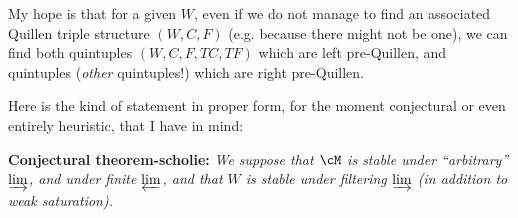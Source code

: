 My hope is that for a given $W$, even if we do not manage to find an associated Quillen triple structure $(W,C,F)$ (e.g. because there might not be one), we can find both quintuples $(W,C,F,TC,TF)$ which are left pre-Quillen, and quintuples (\textit{other} quintuples!) which are right pre-Quillen.

Here is the kind of statement in proper form, for the moment conjectural or even entirely heuristic, that I have in mind:

\textbf{Conjectural theorem-scholie:} \textit{We suppose that $\cM$ is stable under ``arbitrary'' $\varinjlim$, and under finite $\varprojlim$, and that $W$ is stable under filtering $\varinjlim$ (in addition to weak saturation).}